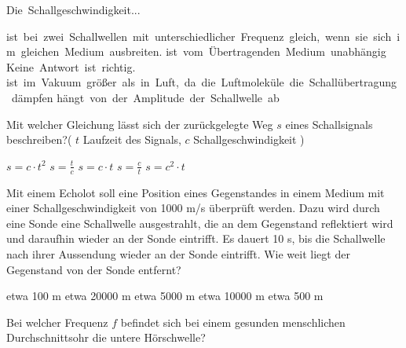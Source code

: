 \documentclass[11pt]{exam}
\begin{document}
\setlength{\voffset}{-0.5in}
\setlength{\headsep}{5pt}

\hspace{2mm}
 \hspace{5mm}
\vspace{4mm}

\begin{questions}

\question Die Schallgeschwindigkeit...

\begin{choices}
	\choice ist bei zwei Schallwellen mit unterschiedlicher Frequenz gleich, wenn sie sich im gleichen Medium ausbreiten.
	\choice ist vom Übertragenden Medium unabhängig
	\choice Keine Antwort ist richtig.
	\choice ist im Vakuum größer als in Luft, da die Luftmoleküle die Schallübertragung dämpfen
	\choice hängt von der Amplitude der Schallwelle ab
\end{choices}

\vspace{3mm}\question Mit welcher Gleichung lässt sich der zurückgelegte Weg \( s \) eines Schallsignals beschreiben?( \( t \) Laufzeit des Signals, \( c \) Schallgeschwindigkeit )

\begin{choices}
	\choice \( s = c \cdot t^2 \)
	\choice \( s= \frac{t}{c} \)
	\choice \( s=c \cdot t \)
	\choice \( s= \frac{c}{t} \)
	\choice \( s=c^2 \cdot t \)
\end{choices}

\vspace{3mm}\question Mit einem Echolot soll eine Position eines Gegenstandes in einem Medium mit einer Schallgeschwindigkeit von 1000 m/s überprüft werden. Dazu wird durch eine Sonde eine Schallwelle ausgestrahlt, die an dem Gegenstand reflektiert wird und daraufhin wieder an der Sonde eintrifft. Es dauert 10 s, bis die Schallwelle nach ihrer Aussendung wieder an der Sonde eintrifft. Wie weit liegt der Gegenstand von der Sonde entfernt?

\begin{choices}
	\choice etwa 100 m
	\choice etwa 20000 m
	\choice etwa 5000 m
	\choice etwa 10000 m
	\choice etwa 500 m
\end{choices}

\vspace{3mm}\question Bei welcher Frequenz \( f \) befindet sich bei einem gesunden menschlichen Durchschnittsohr die untere Hörschwelle?


\end{questions}
\end{document}
